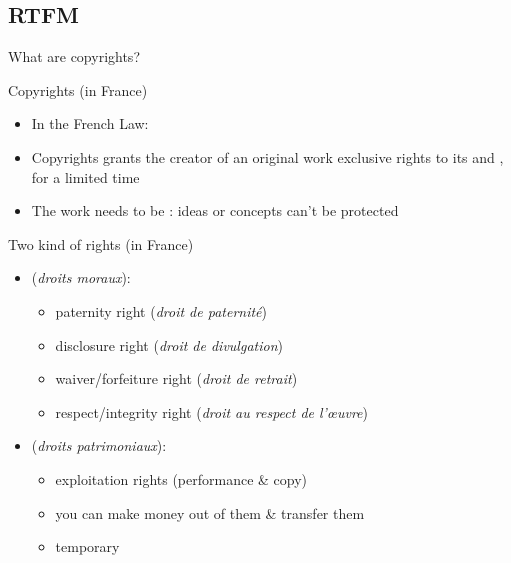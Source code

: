 \documentclass[10pt,xcolor=svgnames]{beamer}
\begin{document}
\subsection{RTFM}
\begin{frame}{What are copyrights?}

  \begin{block}{Copyrights (in France)}
    \begin{itemize}
      \item In the French Law: 
      \item Copyrights grants the creator of an original work exclusive rights to its  and , for a limited time
      \item The work needs to be : ideas or concepts can't be protected
    \end{itemize}
  \end{block}

  \begin{block}{Two kind of rights (in France)}
    \begin{itemize}
      \item {} (\emph{droits moraux}):
        \begin{itemize}
          \item paternity right (\emph{droit de paternité})
          \item disclosure right (\emph{droit de divulgation})
          \item waiver/forfeiture right (\emph{droit de retrait})
          \item respect/integrity right (\emph{droit au respect de l'\oe{}uvre})
        \end{itemize}
      \item {} (\emph{droits patrimoniaux}):
        \begin{itemize}
          \item exploitation rights (performance \& copy)
          \item you can make money out of them \& transfer them 
          \item temporary
        \end{itemize}
    \end{itemize}
  \end{block}

\end{frame}
\end{document}
